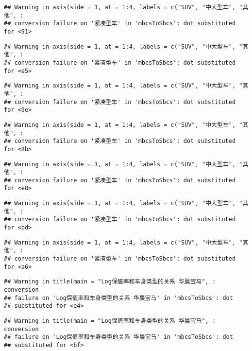 \documentclass[]{article}
\begin{document}
\begin{verbatim}
## Warning in axis(side = 1, at = 1:4, labels = c("SUV", "中大型车", "其他", :
## conversion failure on '紧凑型车' in 'mbcsToSbcs': dot substituted for <91>
\end{verbatim}

\begin{verbatim}
## Warning in axis(side = 1, at = 1:4, labels = c("SUV", "中大型车", "其他", :
## conversion failure on '紧凑型车' in 'mbcsToSbcs': dot substituted for <e5>
\end{verbatim}

\begin{verbatim}
## Warning in axis(side = 1, at = 1:4, labels = c("SUV", "中大型车", "其他", :
## conversion failure on '紧凑型车' in 'mbcsToSbcs': dot substituted for <9e>
\end{verbatim}

\begin{verbatim}
## Warning in axis(side = 1, at = 1:4, labels = c("SUV", "中大型车", "其他", :
## conversion failure on '紧凑型车' in 'mbcsToSbcs': dot substituted for <8b>
\end{verbatim}

\begin{verbatim}
## Warning in axis(side = 1, at = 1:4, labels = c("SUV", "中大型车", "其他", :
## conversion failure on '紧凑型车' in 'mbcsToSbcs': dot substituted for <e8>
\end{verbatim}

\begin{verbatim}
## Warning in axis(side = 1, at = 1:4, labels = c("SUV", "中大型车", "其他", :
## conversion failure on '紧凑型车' in 'mbcsToSbcs': dot substituted for <bd>
\end{verbatim}

\begin{verbatim}
## Warning in axis(side = 1, at = 1:4, labels = c("SUV", "中大型车", "其他", :
## conversion failure on '紧凑型车' in 'mbcsToSbcs': dot substituted for <a6>
\end{verbatim}

\begin{verbatim}
## Warning in title(main = "Log保值率和车身类型的关系 华晨宝马", : conversion
## failure on 'Log保值率和车身类型的关系 华晨宝马' in 'mbcsToSbcs': dot
## substituted for <e4>
\end{verbatim}

\begin{verbatim}
## Warning in title(main = "Log保值率和车身类型的关系 华晨宝马", : conversion
## failure on 'Log保值率和车身类型的关系 华晨宝马' in 'mbcsToSbcs': dot
## substituted for <bf>
\end{verbatim}
\end{document}

